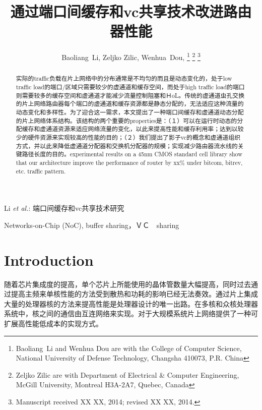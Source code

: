 ﻿\documentclass[10pt,journal]{IEEEtran}
\begin{document}
\title{通过端口间缓存和vc共享技术改进路由器性能}
\author{Baoliang~Li, %
        Zeljko Zilic, %
        Wenhua~Dou, %
\thanks{Baoliang~Li and Wenhua Dou are with the College of Computer Science, National University of Defense Technology, Changsha 410073, P.R. China}%
\thanks{Zeljko Zilic are with Department of Electrical \& Computer Engineering, McGill University, Montreal H3A-2A7, Quebec, Canada}%
\thanks{Manuscript received XX XX, 2014; revised XX XX, 2014.}}

%
{Li \MakeLowercase{\textit{et al.}}: 端口间缓存和vc共享技术研究}

\maketitle

\begin{abstract}
实际的traffic负载在片上网络中的分布通常是不均匀的而且是动态变化的，处于low traffic load的端口/区域只需要较少的虚通道和缓存空间，而处于high traffic load的端口则需要较多的缓存空间和虚通道才能减少流量控制阻塞和ＨoL。传统的虚通道虫孔交换的片上网络路由器每个端口的虚通道和缓存资源都是静态分配的，无法适应这种流量的动态变化和多样性。为了迎合这一需求，本文提出了一种端口间缓存和虚通道动态分配的片上网络体系结构。该结构的两个重要的properties是：（１）可以在运行时动态的分配缓存和虚通道资源来适应网络流量的变化，以此来提高性能和缓存利用率；达到以较少的硬件资源来实现较高的性能的目的；（２）我们提出了影子vc的概念和虚通道组织方式，并以此来降低虚通道分配器和交换机分配器的规模；实现减少路由器流水线的关键路径长度的目的。experimental results on a 45nm CMOS standard cell library show that our architecture improve the performance of router by xx\% under bitcom, bitrev, etc. traffic pattern. 

\end{abstract}
\begin{IEEEkeywords}
Networks-on-Chip (NoC), buffer sharing，ＶＣ　sharing
\end{IEEEkeywords}

\section{Introduction}
随着芯片集成度的提高，单个芯片上所能使用的晶体管数量大幅提高，同时过去通过提高主频来单核性能的方法受到散热和功耗的影响已经无法奏效。通过片上集成大量的处理器核的方法来提高性能是处理器设计的唯一出路。在多核和众核处理器系统中，核之间的通信由互连网络来实现。对于大规模系统片上网络提供了一种可扩展高性能低成本的实现方式。
\end{document}
